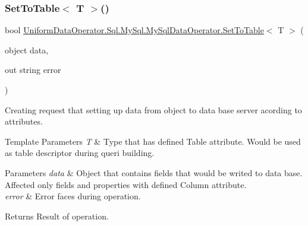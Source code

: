\mbox{\label{class_uniform_data_operator_1_1_sql_1_1_my_sql_1_1_my_sql_data_operator_ac1bee965fd57e9b2949c09a6b72a9e3e}} 
\subsubsection{\texorpdfstring{Set\+To\+Table$<$ T $>$()}{SetToTable< T >()}}
{\footnotesize\ttfamily bool \mbox{\hyperlink{class_uniform_data_operator_1_1_sql_1_1_my_sql_1_1_my_sql_data_operator_a5a12c84883a7e4945b4fb3787a39b302}{Uniform\+Data\+Operator.\+Sql.\+My\+Sql.\+My\+Sql\+Data\+Operator.\+Set\+To\+Table}}$<$ T $>$ (\begin{DoxyParamCaption}\item[{object}]{data,  }\item[{out string}]{error }\end{DoxyParamCaption})}



Creating request that setting up data from object to data base server acording to attributes. 


\begin{DoxyTemplParams}{Template Parameters}
{\em T} & Type that has defined Table attribute. Would be used as table descriptor during queri building.\\
\hline
\end{DoxyTemplParams}

\begin{DoxyParams}{Parameters}
{\em data} & Object that contain\textquotesingle{}s fields that would be writed to data base. Affected only fields and properties with defined Column attribute.\\
\hline
{\em error} & Error faces during operation.\\
\hline
\end{DoxyParams}
\begin{DoxyReturn}{Returns}
Result of operation.
\end{DoxyReturn}
\mbox{\label{class_uniform_data_operator_1_1_sql_1_1_my_sql_1_1_my_sql_data_operator_a036b234868363f2f680e5157ee459439}} 

